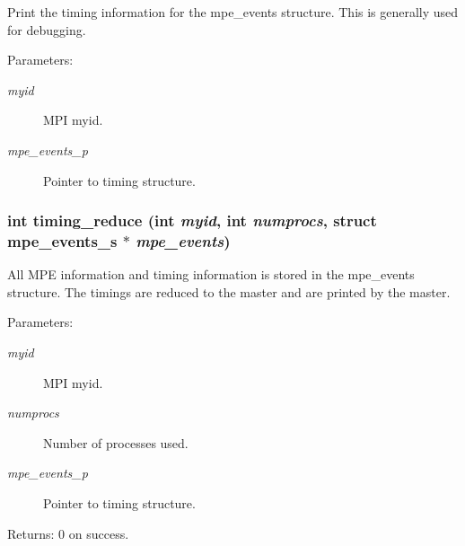Print the timing information for the mpe\_\-events structure. This is generally used for debugging.

\begin{Desc}
\item[Parameters:]
\begin{description}
\item[{\em myid}]MPI myid. \item[{\em mpe\_\-events\_\-p}]Pointer to timing structure. \end{description}
\end{Desc}
\subsubsection{\setlength{\rightskip}{0pt plus 5cm}int timing\_\-reduce (int {\em myid}, int {\em numprocs}, struct \bf{mpe\_\-events\_\-s} $\ast$ {\em mpe\_\-events})}\label{mpe__init_8c_8ef68542f1212a1cc22de50f891678f5}


All MPE information and timing information is stored in the mpe\_\-events structure. The timings are reduced to the master and are printed by the master.

\begin{Desc}
\item[Parameters:]
\begin{description}
\item[{\em myid}]MPI myid. \item[{\em numprocs}]Number of processes used. \item[{\em mpe\_\-events\_\-p}]Pointer to timing structure. \end{description}
\end{Desc}
\begin{Desc}
\item[Returns:]0 on success. \end{Desc}
